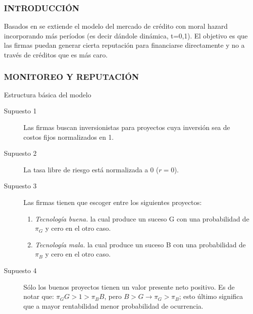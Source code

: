 \begin{frame}
	\frametitle{{\normalsize INTRODUCCIÓN} {}}
	\setcounter{equation}{0}
Basados en  \cite{Diamond1991} se extiende el modelo del mercado de crédito con moral hazard incorporando más períodos (es decir dándole dinámica, t=0,1). El objetivo es que las firmas puedan generar cierta reputación para financiarse directamente y no a través de créditos que es más caro.

 

\end{frame}

\begin{frame}
    \frametitle{{\normalsize MONITOREO Y REPUTACIÓN} {}}
    
    \begin{block} {Estructura básica del modelo}
        \begin{description}
              \item[Supuesto 1]  Las firmas buscan inversionistas para proyectos cuya inversión sea de costos fijos normalizados en 1.
            \item[Supuesto 2] La tasa libre de riesgo está normalizada a 0 ($r=0$). 
            \item[Supuesto 3] Las firmas tienen que escoger entre los siguientes proyectos:
            \begin{enumerate}
               \item \textit{Tecnología buena.} la cual produce un suceso G con una probabilidad de $\pi_{G} $ y cero en el otro caso.
               \item \textit{Tecnología mala.} la cual produce un suceso B con una probabilidad de $\pi_{B} $ y cero en el otro caso.
            \end{enumerate}
            \item[Supuesto 4] Sólo los buenos proyectos tienen un valor presente neto positivo. Es de notar que: $\pi_{G}G>1>\pi_{B}B $, pero $B>G\rightarrow \pi_{G}>\pi_{B} $; esto último significa que a mayor rentabilidad menor probabilidad de ocurrencia. 
           
             
            \end{description}
        
    \end{block}	
    
\end{frame}


